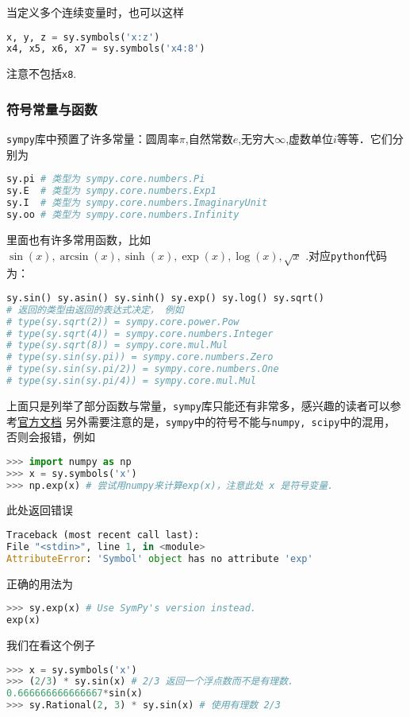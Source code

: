 当定义多个连续变量时，也可以这样
\begin{lstlisting}[language=python]
 x, y, z = sy.symbols('x:z')
x4, x5, x6, x7 = sy.symbols('x4:8')
\end{lstlisting}
注意不包括\verb|x8|.

\subsubsection{符号常量与函数}
\verb|sympy|库中预置了许多常量：圆周率$\pi$,自然常数$e$,无穷大$\infty$,虚数单位$i$等等．它们分别为
\begin{lstlisting}[language=python]
sy.pi # 类型为 sympy.core.numbers.Pi
sy.E  # 类型为 sympy.core.numbers.Exp1
sy.I  # 类型为 sympy.core.numbers.ImaginaryUnit
sy.oo # 类型为 sympy.core.numbers.Infinity 
\end{lstlisting}
里面也有许多常用函数，比如 $\sin(x), \arcsin(x), \sinh(x), \exp(x), \log(x),\sqrt{x}$ .对应\verb|python|代码为：
\begin{lstlisting}[language=python]
sy.sin() sy.asin() sy.sinh() sy.exp() sy.log() sy.sqrt()
# 返回的类型由返回的表达式决定， 例如
# type(sy.sqrt(2)) = sympy.core.power.Pow
# type(sy.sqrt(4)) = sympy.core.numbers.Integer
# type(sy.sqrt(8)) = sympy.core.mul.Mul
# type(sy.sin(sy.pi)) = sympy.core.numbers.Zero
# type(sy.sin(sy.pi/2)) = sympy.core.numbers.One
# type(sy.sin(sy.pi/4)) = sympy.core.mul.Mul
\end{lstlisting}
上面只是列举了部分函数与常量，\verb|sympy|库只能还有非常多，感兴趣的读者可以参考\href{https://docs.sympy.org/latest/index.html}{官方文档}
另外需要注意的是，\verb|sympy|中的符号不能与\verb|numpy, scipy|中的混用，否则会报错，例如
\begin{lstlisting}[language=python]
>>> import numpy as np
>>> x = sy.symbols('x')
>>> np.exp(x) # 尝试用numpy来计算exp(x)，注意此处 x 是符号变量.
\end{lstlisting}
此处返回错误
\begin{lstlisting}[language=python]
Traceback (most recent call last):
File "<stdin>", line 1, in <module>
AttributeError: 'Symbol' object has no attribute 'exp'
\end{lstlisting}
正确的用法为
\begin{lstlisting}[language=python]
>>> sy.exp(x) # Use SymPy's version instead.
exp(x)
\end{lstlisting}
我们在看这个例子
\begin{lstlisting}[language=python]
>>> x = sy.symbols('x')
>>> (2/3) * sy.sin(x) # 2/3 返回一个浮点数而不是有理数.
0.666666666666667*sin(x)
>>> sy.Rational(2, 3) * sy.sin(x) # 使用有理数 2/3
\end{lstlisting}
